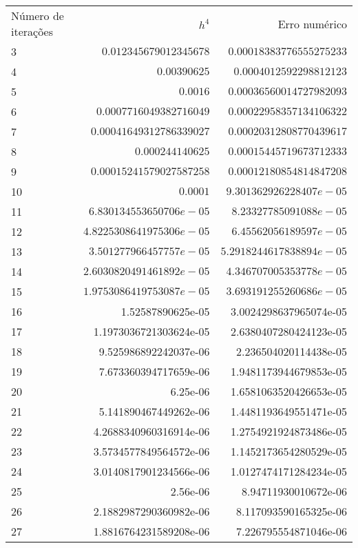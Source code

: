 \documentclass[]{article}
\begin{document}
\begin{tabular}{l  r r} 
Número de iterações & $h^4$ &  Erro numérico\\
3     & $0.012345679012345678$ & $0.00018383776555275233$\\
4     & $0.00390625$ & $0.0004012592298812123$\\
5     &   $0.0016$ & $0.00036560014727982093$\\
6     &   $0.0007716049382716049$ & $0.00022958357134106322$\\
7    &    $0.00041649312786339027$ & $0.00020312808770439617$\\
8    &    $0.000244140625$ & $0.00015445719673712333$\\
9    &    $0.00015241579027587258$ & $0.00012180854814847208$\\
10  &     $0.0001$ & $9.301362926228407e-05$\\
11  &      $6.830134553650706e-05$ & $8.23327785091088e-05$\\
12     &  $4.8225308641975306e-05$ & $6.45562056189597e-05$\\
13     &  $3.501277966457757e-05$ & $5.2918244617838894e-05$\\
14     &  $2.6030820491461892e-05$ & $4.346707005353778e-05$\\
15    &   $1.9753086419753087e-05$ & $3.693191255260686e-05$\\
16 &      1.52587890625e-05      & 3.0024298637965074e-05\\
17 &      1.1973036721303624e-05   & 2.6380407280424123e-05\\
18 &      9.525986892242037e-06  &   2.236504020114438e-05\\
19 &      7.673360394717659e-06  &   1.9481173944679853e-05\\
20 &      6.25e-06           &       1.6581063520426653e-05\\
21 &      5.141890467449262e-06   &  1.4481193649551471e-05\\
22 &      4.2688340960316914e-06  &  1.2754921924873486e-05\\
23 &      3.5734577849564572e-06  &  1.1452173654280529e-05\\
24 &      3.0140817901234566e-06  &  1.0127474171284234e-05\\
25 &      2.56e-06               &   8.94711930010672e-06\\
26 &      2.1882987290360982e-06 &   8.117093590165325e-06\\
27 &      1.8816764231589208e-06 &   7.226795554871046e-06\\

\end{tabular}
\end{document}
